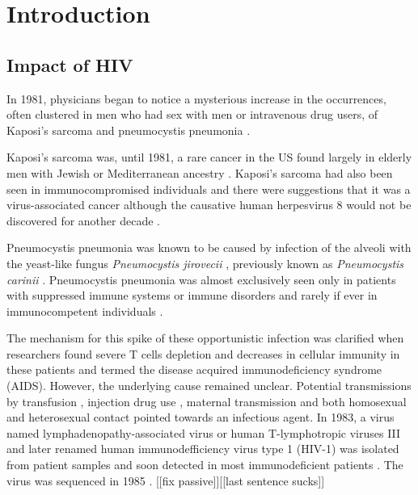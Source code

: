 \documentclass[../sherrill-Mix_thesis.tex]{subfiles}
\begin{document}
\graphicspath{{im/}{intro/im/}}
\chapter{Introduction}
\section{Impact of HIV}
	In 1981, physicians began to notice a mysterious increase in the occurrences, often clustered in men who had sex with men or intravenous drug users, of Kaposi's sarcoma and pneumocystis pneumonia \citep{Gottlieb1981,Friedman-Kien1981,Hymes1981,Masur1981,Siegal1981,Gottlieb1981a}. 
	
	Kaposi's sarcoma was, until 1981, a rare cancer in the US found largely in elderly men with Jewish or Mediterranean ancestry \citep{Laor1979}. Kaposi's sarcoma had also been seen in immunocompromised individuals \citep{Klein1974,Myers1974,Kapadia1977} and there were suggestions that it was a virus-associated cancer \citep{Safai1981} although the causative human herpesvirus 8 would not be discovered for another decade \citep{Chang1994,Sitas1999}. 
	
	Pneumocystis pneumonia was known to be caused by infection of the alveoli with the yeast-like fungus \emph{Pneumocystis jirovecii} \citep{Burke1973,Hughes1977}, previously known as \emph{Pneumocystis carinii} \citep{Stringer2009}. Pneumocystis pneumonia was almost exclusively seen only in patients with suppressed immune systems or immune disorders and rarely if ever in immunocompetent individuals \citep{Hughes1977}.

	The mechanism for this spike of these opportunistic infection was clarified when researchers found severe T cells depletion and decreases in cellular immunity in these patients \citep{Masur1981,Siegal1981,Gottlieb1981a,Gerstoft1982,Masur1982} and termed the disease acquired immunodeficiency syndrome (AIDS). However, the underlying cause remained unclear. Potential transmissions by transfusion \citep{Ammann1982,Ehrenkranz1982,Poon1982}, injection drug use \citep{Masur1981,Masur1982,Greene1982}, maternal transmission \citep{OReilly1982} and both homosexual \citep{Fannin1982,Gerstoft1982} and heterosexual \citep{Masur1982,Harris1983} contact pointed towards an infectious agent. In 1983, a virus named lymphadenopathy-associated virus or human T-lymphotropic viruses III and later renamed human immunodefficiency virus type 1 (HIV-1) was isolated from patient samples \citep{Barre-Sinoussi1983,Gallo1983,Popovic1984,Levy1984} and soon detected in most immunodeficient patients \citep{Gallo1984,Sarngadharan1984,Safai1984,Levy1984}. The virus was sequenced in 1985 \citep{Wain-Hobson1985}. [[fix passive]][[last sentence sucks]]
\end{document}
